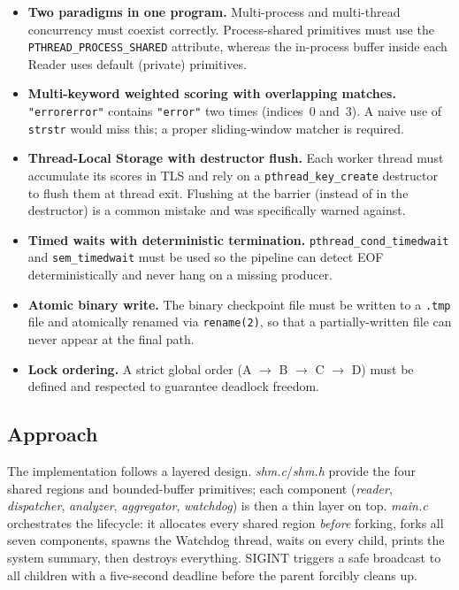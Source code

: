 \documentclass[11pt,a4paper]{article}
\newcommand{\code}[1]{\texttt{\small #1}}
\newcommand{\fname}[1]{\textit{\small #1}}
\begin{document}
\begin{itemize}
    \item \textbf{Two paradigms in one program.} Multi-process and
        multi-thread concurrency must coexist correctly. Process-shared
        primitives must use the \code{PTHREAD\_PROCESS\_SHARED} attribute,
        whereas the in-process buffer inside each Reader uses default
        (private) primitives.

    \item \textbf{Multi-keyword weighted scoring with overlapping matches.}
        \code{"errorerror"} contains \code{"error"} two times (indices~0
        and~3). A naive use of \code{strstr} would miss this; a proper
        sliding-window matcher is required.

    \item \textbf{Thread-Local Storage with destructor flush.} Each worker
        thread must accumulate its scores in TLS and rely on a
        \code{pthread\_key\_create} destructor to flush them at thread exit.
        Flushing at the barrier (instead of in the destructor) is a common
        mistake and was specifically warned against.

    \item \textbf{Timed waits with deterministic termination.}
        \code{pthread\_cond\_timedwait} and \code{sem\_timedwait} must be
        used so the pipeline can detect EOF deterministically and never
        hang on a missing producer.

    \item \textbf{Atomic binary write.} The binary checkpoint file must be
        written to a \code{.tmp} file and atomically renamed via
        \code{rename(2)}, so that a partially-written file can never appear
        at the final path.

    \item \textbf{Lock ordering.} A strict global order
        (A $\to$ B $\to$ C $\to$ D) must be defined and respected to
        guarantee deadlock freedom.
\end{itemize}

\subsection{Approach}

The implementation follows a layered design. \fname{shm.c}/\fname{shm.h}
provide the four shared regions and bounded-buffer primitives; each
component (\fname{reader}, \fname{dispatcher}, \fname{analyzer},
\fname{aggregator}, \fname{watchdog}) is then a thin layer on top.
\fname{main.c} orchestrates the lifecycle: it allocates every shared region
\emph{before} forking, forks all seven components, spawns the Watchdog
thread, waits on every child, prints the system summary, then destroys
everything. SIGINT triggers a safe broadcast to all children with a
five-second deadline before the parent forcibly cleans up.
\end{document}
